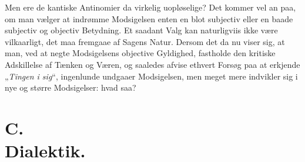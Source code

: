 \documentclass[12pt,a4paper]{book}
\renewcommand{\thefootnote}{\ifcase\value{footnote}\or *)\or **)\or ***)\fi}
\begin{document}
Men ere de kantiske Antinomier da virkelig uopløselige? Det kommer
vel an paa, om man vælger at indrømme Modsigelsen enten en blot
subjectiv eller en baade subjectiv og objectiv Betydning. Et saadant
Valg kan naturligviis ikke være vilkaarligt, det maa fremgaae af
Sagens Natur. Dersom det da nu viser sig, at man, ved at negte
Modsigelsens objective Gyldighed, fastholde den kritiske Adskillelse
af Tænken og Væren, og saaledes afvise ethvert Forsøg paa at erkjende
„\emph{Tingen i sig}“, ingenlunde undgaaer Modsigelsen, men meget mere
indvikler sig i nye og større Modsigelser: hvad saa?


\setcounter{footnote}{0}
\section*{C.\\ Dialektik.}

\end{document}
